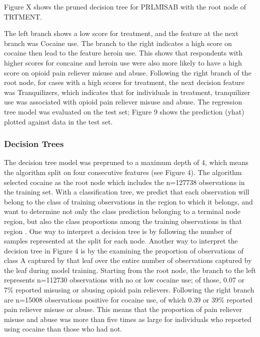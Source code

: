 \documentclass[sigconf]{acmart}
\begin{document}
Figure X shows the 
pruned decision tree for PRLMISAB with the root node of TRTMENT. 

The left branch shows a low score for treatment, and the feature at the next 
branch was Cocaine use. 
The branch to the right indicates a high score on cocaine then lead to 
the feature heroin use. This shows that respondents with higher scores for 
concaine and heroin use were also more likely to have a high score on 
opioid pain reliever misuse and abuse. Following the right branch of the 
root node, for cases with a high scores for treatment, the next decision 
feature was Tranquilizers, which indicates that for individuals in treatment, 
tranquilizer use was associated with opioid pain reliever misuse and abuse. 
The regression tree model was evaluated on the test set; Figure 9 shows 
the prediction (yhat) plotted against data in the test set.

\subsubsection{Decision Trees} 

The decision tree model was prepruned to a maximum depth of 4, which means 
the algorithm split on four consecutive features (see Figure 4). The  
algorithm selected cocaine as the root node which includes the n=127738 
observations in the training set. With a classification tree, we predict 
that each observation will belong to the class of training observations in 
the region to which it belongs, and want to determine not only the class
prediction belonging to a terminal node region, but also the class 
proportions among the training observations in that region \cite{james13}. 
One way to interpret a decision tree is by following the number of samples 
represented at the split for each node. Another way to interpret the decision 
tree in Figure 4 is by the examining the proportion of observations of 
class A captured by that leaf over the entire number of observations captured 
by the leaf during model training. Starting from the root node, the branch 
to the left represents n=112730 observations with no or low cocaine use; 
of those, 0.07 or 7\% reported misusing or abusing opioid pain relievers. 
Following the right branch are n=15008 observations positive for cocaine use, 
of which 0.39 or 39\% reported pain reliever misuse or abuse. This means that 
the proportion of pain reliever misuse and abuse was more than five times as 
large for individuals who reported using cocaine than those who had not. 
\end{document}
